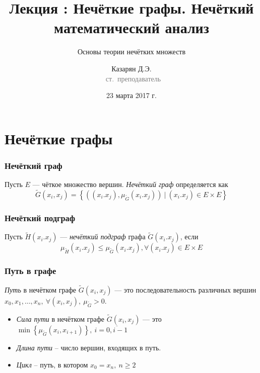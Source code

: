 \documentclass{beamer}
\title{Лекция \textnumero 4: Нечёткие графы. Нечёткий математический анализ}
\subtitle{Основы теории нечётких множеств}
\author{Казарян Д.Э.\\{\footnotesize\textcolor{gray}{~ст.~преподаватель}}}
\institute{РУДН, Инженерная академия\\Департамент механики и мехатроники}
\date{23 марта 2017 г.}
\begin{document}
\lstset{language=python}

\frame{\titlepage}

\section{Нечёткие графы}

\begin{frame}\frametitle{Нечёткий граф}
    \begin{definition}
        Пусть $E$ --- чёткое множество вершин. \textit{Нечёткий граф} определяется как
        \[
            \tilde{G}(x_i, x_j) = \left\{ \left( \left( x_i. x_j \right), \mu_{\tilde{G}}\left( x_i. x_j \right) \right)\ |\ \left( x_i. x_j \right) \in E \times E \right\}
        \]
    \end{definition}
\end{frame}


\begin{frame}\frametitle{Нечёткий подграф}
    \begin{definition}
        Пусть $\tilde{H}\left( x_i. x_j \right)$ --- \textit{нечёткий подграф} графа $\tilde{G}\left( x_i. x_j \right)$, если
        \[
            \mu_{\tilde{H}}\left( x_i. x_j \right) \leq \mu_{\tilde{G}}\left( x_i. x_j \right), \forall \left( x_i. x_j \right) \in E \times E
        \]
    \end{definition}
\end{frame}

\begin{frame}\frametitle{Путь в графе}
    \begin{definition}
        \textit{Путь} в нечётком графе $\tilde{G}(x_i, x_j)$ --- это последовательность различных вершин $x_0, x_1, \dots, x_n,\ \forall (x_i, x_j),\ \mu_{\tilde{G}} > 0$.
    \end{definition}

    \begin{itemize}
        \item \textit{Сила пути} в нечётком графе $\tilde{G}(x_i, x_j)$ --- это $\min\left\{ \mu_{\tilde{G}}\left(x_i, x_{i+1}\right) \right\},\ i = \overline{0, i-1}$
        \item \textit{Длина пути} -- число вершин, входящих в путь.
        \item \textit{Цикл} -- путь, в котором $x_0 = x_n,\ n \geq 2$
    \end{itemize}
    
\end{frame}
\end{document}
